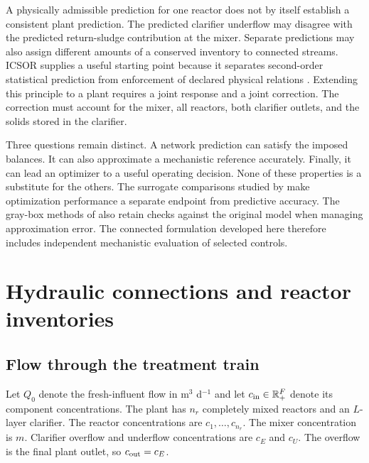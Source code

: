 A physically admissible prediction for one reactor does not by itself establish a consistent plant prediction. The predicted clarifier underflow may disagree with the predicted return-sludge contribution at the mixer. Separate predictions may also assign different amounts of a conserved inventory to connected streams. ICSOR supplies a useful starting point because it separates second-order statistical prediction from enforcement of declared physical relations \citep{Selerio2026}. Extending this principle to a plant requires a joint response and a joint correction. The correction must account for the mixer, all reactors, both clarifier outlets, and the solids stored in the clarifier.

Three questions remain distinct. A network prediction can satisfy the imposed balances. It can also approximate a mechanistic reference accurately. Finally, it can lead an optimizer to a useful operating decision. None of these properties is a substitute for the others. The surrogate comparisons studied by \citet{Pedrozo2025} make optimization performance a separate endpoint from predictive accuracy. The gray-box methods of \citet{Hameed2026} also retain checks against the original model when managing approximation error. The connected formulation developed here therefore includes independent mechanistic evaluation of selected controls.

\section{Hydraulic connections and reactor inventories}

\subsection{Flow through the treatment train}

Let $Q_0$ denote the fresh-influent flow in m$^3$ d$^{-1}$ and let $c_{\rm in}\in\mathbb R_+^F$ denote its component concentrations. The plant has $n_r$ completely mixed reactors and an $L$-layer clarifier. The reactor concentrations are $c_1,\ldots,c_{n_r}$. The mixer concentration is $m$. Clarifier overflow and underflow concentrations are $c_E$ and $c_U$. The overflow is the final plant outlet, so $c_{\rm out}=c_E$.


